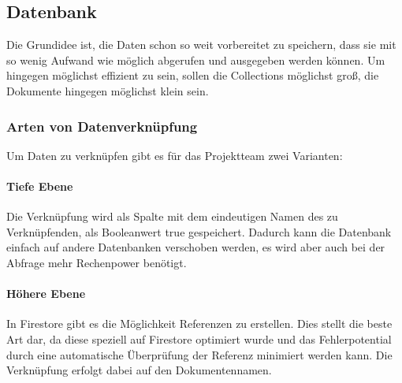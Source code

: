 \subsection{Datenbank}


\noindent Die Grundidee ist, die Daten schon so weit vorbereitet zu speichern, dass sie mit so wenig Aufwand wie möglich abgerufen und ausgegeben werden können. Um hingegen möglichst effizient zu sein, sollen die Collections möglichst groß, die Dokumente hingegen möglichst klein sein.

\subsubsection{Arten von Datenverknüpfung}

Um Daten zu verknüpfen gibt es für das Projektteam zwei Varianten:

\paragraph{Tiefe Ebene}
Die Verknüpfung wird als Spalte mit dem eindeutigen Namen des zu Verknüpfenden, als Booleanwert true gespeichert.  Dadurch kann die Datenbank einfach auf andere Datenbanken verschoben werden, es wird aber auch bei der Abfrage mehr Rechenpower benötigt.

\paragraph{Höhere Ebene}
In Firestore gibt es die Möglichkeit Referenzen zu erstellen. Dies stellt die beste Art dar, da diese speziell auf Firestore optimiert wurde und das Fehlerpotential durch eine automatische Überprüfung der Referenz minimiert werden kann. Die Verknüpfung erfolgt dabei auf den Dokumentennamen.
